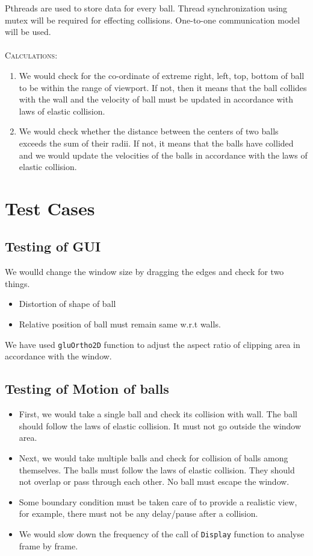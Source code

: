 \documentclass[10pt]{article}
\begin{document}
	Pthreads are used to store data for every ball. Thread synchronization using mutex will be required for effecting collisions. One-to-one communication model will be used.\\\\
	\textsc{Calculations:}
	\begin{enumerate}
	\item
	We would check for the co-ordinate of extreme right, left, top, bottom of ball to be within the range of viewport. If not, then it means that the ball collides with the wall and the velocity of ball must be updated in accordance with laws of elastic collision.
	\item
	We would check whether the distance between the centers of two balls exceeds the sum of their radii. If not, it means that the balls have collided and we would update the velocities of the balls in accordance with the laws of elastic collision. 	
	\end{enumerate}

\section{Test Cases}
	\subsection{Testing of GUI}
		We woulld change the window size by dragging the edges and check for two things.
		\begin{itemize}
		\item Distortion of shape of ball
		\item Relative position of ball must remain same w.r.t walls.
		\end{itemize}
		We have used \texttt{gluOrtho2D} function to adjust the aspect ratio of clipping area in accordance with the window.
	\subsection{Testing of Motion of balls}
		\begin{itemize}
		\item First, we would take a single ball and check its collision with wall. The ball should follow the laws of elastic collision. It must not go outside the window area.
		\item Next, we would take multiple balls and check for collision of balls among themselves. The balls must follow the laws of elastic collision. They should not overlap or pass through each other. No ball must escape the window.
		\item Some boundary condition must be taken care of to provide a realistic view, for example, there must not be any delay/pause after a collision.
		\item We would slow down the frequency of the call of \texttt{Display} function to analyse frame by frame.
		\end{itemize}
\end{document}
